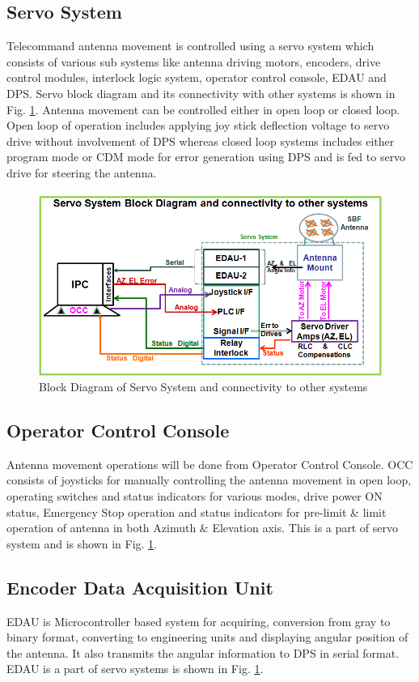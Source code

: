 \subsection{Servo System}
Telecommand antenna movement is controlled using a servo system which consists of various sub systems like antenna driving motors, encoders, drive control modules, interlock logic system, operator control console, EDAU and DPS. Servo block diagram and its connectivity with other systems is shown in Fig. \ref{FIG:ServoDiag}. Antenna movement can be controlled either in open loop or closed loop. Open loop of operation includes applying joy stick deflection voltage to servo drive without involvement of DPS whereas closed loop systems includes either program mode or CDM mode for error generation using DPS and is fed to servo drive for steering the antenna.

\begin{figure}[H]
	\centering
	\includegraphics[width=\linewidth]{./Diagrams/BlockServo.png}
	\caption{Block Diagram of Servo System and connectivity to other systems }
	\label{FIG:ServoDiag}
\end{figure}


\subsection{Operator Control Console}
Antenna movement operations will be done from Operator Control Console. OCC consists of joysticks for manually controlling the antenna movement in open loop, operating switches and status indicators for various modes, drive power ON status, Emergency Stop operation and status indicators for pre-limit \& limit operation of antenna in both Azimuth \& Elevation axis. This is a part of servo system and is shown in Fig. \ref{FIG:ServoDiag}.

\subsection{Encoder Data Acquisition Unit}
EDAU is Microcontroller based system for acquiring, conversion from gray to binary format, converting to engineering units and displaying angular position of the antenna. It also transmits the angular information to DPS in serial format. EDAU is a part of servo systems is shown in Fig. \ref{FIG:ServoDiag}.

